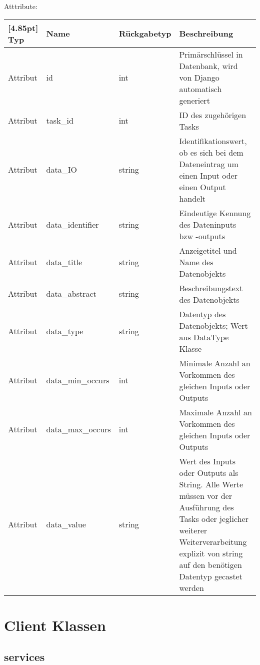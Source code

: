 	         Atttribute:
	         \begin{center}
	         	\setlength\tabcolsep{5pt}
	         	\renewcommand{\arraystretch}{1.5}
	         	
	         	\begin{tabularx}{\textwidth}{|l|l|l|X|}
	         		\hline
	         		\rowcolor[gray]{0.75}[4.85pt]
	         		Typ & Name & Rückgabetyp & Beschreibung \\ \hline 
	         		Attribut & id & int & Primärschlüssel in Datenbank, wird von Django automatisch generiert \\ \hline
	         		Attribut & task\_id & int & ID des zugehörigen Tasks\\ \hline
	         		Attribut & data\_IO & string & Identifikationswert, ob es sich bei dem Dateneintrag um einen Input oder einen Output handelt\\ \hline
	         		Attribut & data\_identifier & string & Eindeutige Kennung des Dateninputs bzw -outputs\\ \hline
	         		Attribut & data\_title & string & Anzeigetitel und Name des Datenobjekts\\ \hline
	         		Attribut & data\_abstract & string & Beschreibungstext des Datenobjekts\\ \hline
	         		Attribut & data\_type & string & Datentyp des Datenobjekts; Wert aus DataType Klasse \\ \hline
	         		Attribut & data\_min\_occurs & int & Minimale Anzahl an Vorkommen des gleichen Inputs oder Outputs \\ \hline
	         		Attribut & data\_max\_occurs & int & Maximale Anzahl an Vorkommen des gleichen Inputs oder Outputs \\ \hline
	         		Attribut & data\_value & string & Wert des Inputs oder Outputs als String. Alle Werte müssen vor der Ausführung des Tasks oder jeglicher weiterer Weiterverarbeitung explizit von string auf den benötigen Datentyp gecastet werden\\
	         		\hline
	         	\end{tabularx}
	         \end{center}

\newpage

    \section{Client Klassen}
    
        \subsection{services}
    
